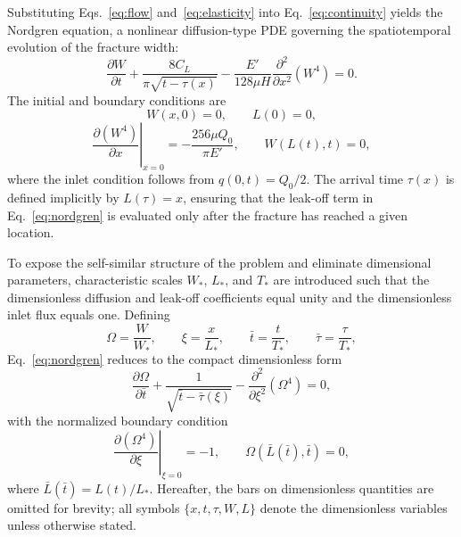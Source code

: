 \documentclass[a4paper,fleqn]{cas-sc}
\begin{document}
Substituting Eqs.~\eqref{eq:flow} and~\eqref{eq:elasticity} into
Eq.~\eqref{eq:continuity} yields the Nordgren equation, a nonlinear
diffusion-type PDE governing the spatiotemporal evolution of the
fracture width:
\begin{equation}
  \frac{\partial W}{\partial t}
  + \frac{8 C_L}{\pi\sqrt{t - \tau(x)}}
  - \frac{E'}{128\mu H}\frac{\partial^2}{\partial x^2}\!\left(W^4\right)
  = 0.
  \label{eq:nordgren}
\end{equation}
The initial and boundary conditions are
\begin{equation}
  W(x,0) = 0,\qquad L(0) = 0,
  \label{eq:ic}
\end{equation}
\begin{equation}
  \left.\frac{\partial (W^4)}{\partial x}\right|_{x=0}
  = -\frac{256\mu Q_0}{\pi E'},\qquad
  W(L(t),t) = 0,
  \label{eq:bc}
\end{equation}
where the inlet condition follows from $q(0,t) = Q_0/2$. The arrival
time $\tau(x)$ is defined implicitly by $L(\tau) = x$, ensuring that
the leak-off term in Eq.~\eqref{eq:nordgren} is evaluated only after
the fracture has reached a given location.

To expose the self-similar structure of the problem and eliminate
dimensional parameters, characteristic scales $W_*$, $L_*$, and $T_*$
are introduced such that the dimensionless diffusion and leak-off
coefficients equal unity and the dimensionless inlet flux equals one.
Defining
\begin{equation}
  \Omega = \frac{W}{W_*},\qquad
  \xi = \frac{x}{L_*},\qquad
  \bar{t} = \frac{t}{T_*},\qquad
  \bar{\tau} = \frac{\tau}{T_*},
  \label{eq:dimless}
\end{equation}
Eq.~\eqref{eq:nordgren} reduces to the compact dimensionless form
\cite{Kemp1990,Detournay2016}
\begin{equation}
  \frac{\partial\Omega}{\partial\bar{t}}
  + \frac{1}{\sqrt{\bar{t} - \bar{\tau}(\xi)}}
  - \frac{\partial^2}{\partial\xi^2}\!\left(\Omega^4\right)
  = 0,
  \label{eq:nordgren-dim}
\end{equation}
with the normalized boundary condition
\begin{equation}
  \left.\frac{\partial(\Omega^4)}{\partial\xi}\right|_{\xi=0} = -1,
  \qquad
  \Omega(\bar{L}(\bar{t}),\bar{t}) = 0,
  \label{eq:bc-dim}
\end{equation}
where $\bar{L}(\bar{t}) = L(t)/L_*$. Hereafter, the bars on
dimensionless quantities are omitted for brevity; all symbols
$\{x, t, \tau, W, L\}$ denote the dimensionless variables unless
otherwise stated.
\end{document}
